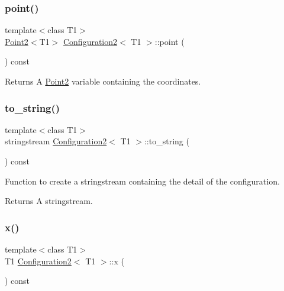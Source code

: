 \subsubsection{\texorpdfstring{point()}{point()}}
{\footnotesize\ttfamily template$<$class T1$>$ \\
\mbox{\hyperlink{class_point2}{Point2}}$<$T1$>$ \mbox{\hyperlink{class_configuration2}{Configuration2}}$<$ T1 $>$\+::point (\begin{DoxyParamCaption}{ }\end{DoxyParamCaption}) const\hspace{0.3cm}{\ttfamily [inline]}}

\begin{DoxyReturn}{Returns}
A {\ttfamily \mbox{\hyperlink{class_point2}{Point2}}} variable containing the coordinates. 
\end{DoxyReturn}
\mbox{\label{class_configuration2_ac68ba3be6be597763a5caa4bd7efa3d8}} 
\subsubsection{\texorpdfstring{to\_string()}{to\_string()}}
{\footnotesize\ttfamily template$<$class T1$>$ \\
stringstream \mbox{\hyperlink{class_configuration2}{Configuration2}}$<$ T1 $>$\+::to\+\_\+string (\begin{DoxyParamCaption}{ }\end{DoxyParamCaption}) const\hspace{0.3cm}{\ttfamily [inline]}}



Function to create a stringstream containing the detail of the configuration. 

\begin{DoxyReturn}{Returns}
A stringstream. 
\end{DoxyReturn}
\mbox{\label{class_configuration2_a430b4b412cbdad376feec03c52bde56f}} 
\subsubsection{\texorpdfstring{x()}{x()}\hspace{0.1cm}{\footnotesize\ttfamily [1/2]}}
{\footnotesize\ttfamily template$<$class T1$>$ \\
T1 \mbox{\hyperlink{class_configuration2}{Configuration2}}$<$ T1 $>$\+::x (\begin{DoxyParamCaption}{ }\end{DoxyParamCaption}) const\hspace{0.3cm}{\ttfamily [inline]}}

